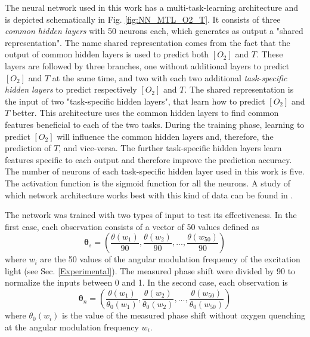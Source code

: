\documentclass[final,5p,times,twocolumn]{elsarticle}
\begin{document}
The neural network used in this work has a multi-task-learning architecture and is depicted schematically in Fig. \ref{fig:NN_MTL_O2_T}. It consists of three {\sl common hidden layers} with 50 neurons each, which generates as output a "shared representation". The name shared representation comes from the fact that the output of common hidden layers is used to predict both $[O_2]$ and $T$. These layers are followed by three branches, one without additional layers to predict $[O_2]$ and $T$ at the same time, and two with each two additional {\sl task-specific hidden layers} to predict respectively $[O_2]$ and $T$. The shared representation is the input of two "task-specific hidden layers", that learn how to predict $[O_2]$ and $T$ better. This architecture uses the common hidden layers to find common features beneficial to each of the two tasks. During the training phase, learning to predict $[O_2]$ will influence the common hidden layers and, therefore, the prediction of $T$, and vice-versa. The further task-specific hidden layers learn features specific to each output and therefore improve the prediction accuracy. The number of neurons of each task-specific hidden layer used in this work is five. The activation function is the sigmoid function for all the neurons.  A study of which network architecture works best with this kind of data can be found in \cite{Michelucci2019_2}.

The network was trained with two types of input to test its effectiveness. In the first case, each observation consists of a vector of 50 values defined as
\begin{equation}
\label{input1}
{\pmb \theta}_s = \left(
\frac{\theta(w_1)}{90} , \frac{\theta(w_2)}{90} , ..., \frac{\theta(w_{50})}{90} 
\right)
\end{equation}
where $w_i$ are the 50 values of the angular modulation frequency of the excitation light (see Sec. \ref{Experimental}). The measured phase shift were divided by 90 to normalize the inputs between 0 and 1. In the second case, each observation is
\begin{equation}
\label{input2}
{\pmb \theta}_n = \left(
\frac{\theta(w_1)}{\theta_0(w_1)} , \frac{\theta(w_2)}{\theta_0(w_2)} , ..., \frac{\theta(w_{50})}{\theta_0(w_{50})} 
\right)
\end{equation}
where $\theta_0(w_i)$ is the value of the measured phase shift without oxygen quenching at the angular modulation frequency $w_i$.
\end{document}
